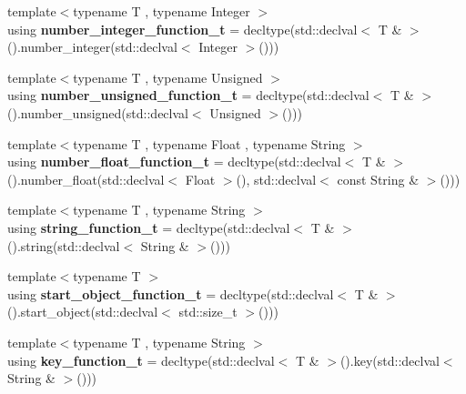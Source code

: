 \begin{DoxyCompactItemize}
{\footnotesize template$<$typename T , typename Integer $>$ }\\using {\bfseries number\+\_\+integer\+\_\+function\+\_\+t} = decltype(std\+::declval$<$ T \& $>$().number\+\_\+integer(std\+::declval$<$ Integer $>$()))
\item 
\mbox{\label{namespacenlohmann_1_1detail_a74da7b17bda76f65d276feb18209c913}} 
{\footnotesize template$<$typename T , typename Unsigned $>$ }\\using {\bfseries number\+\_\+unsigned\+\_\+function\+\_\+t} = decltype(std\+::declval$<$ T \& $>$().number\+\_\+unsigned(std\+::declval$<$ Unsigned $>$()))
\item 
\mbox{\label{namespacenlohmann_1_1detail_ad42df56e913abe26ed556e0e92f386f4}} 
{\footnotesize template$<$typename T , typename Float , typename String $>$ }\\using {\bfseries number\+\_\+float\+\_\+function\+\_\+t} = decltype(std\+::declval$<$ T \& $>$().number\+\_\+float(std\+::declval$<$ Float $>$(), std\+::declval$<$ const String \& $>$()))
\item 
\mbox{\label{namespacenlohmann_1_1detail_a27c3fc3bd42ac406f763184aa8ae4cb0}} 
{\footnotesize template$<$typename T , typename String $>$ }\\using {\bfseries string\+\_\+function\+\_\+t} = decltype(std\+::declval$<$ T \& $>$().string(std\+::declval$<$ String \& $>$()))
\item 
\mbox{\label{namespacenlohmann_1_1detail_a5fff1e6dcaabd367d9b1109a5682f9d4}} 
{\footnotesize template$<$typename T $>$ }\\using {\bfseries start\+\_\+object\+\_\+function\+\_\+t} = decltype(std\+::declval$<$ T \& $>$().start\+\_\+object(std\+::declval$<$ std\+::size\+\_\+t $>$()))
\item 
\mbox{\label{namespacenlohmann_1_1detail_a44869ca9f422b260625d78e4e8121559}} 
{\footnotesize template$<$typename T , typename String $>$ }\\using {\bfseries key\+\_\+function\+\_\+t} = decltype(std\+::declval$<$ T \& $>$().key(std\+::declval$<$ String \& $>$()))
\item 
\mbox{\label{namespacenlohmann_1_1detail_af52d6d2521c386998ae940d118182ebc}} 

\end{DoxyCompactItemize}
